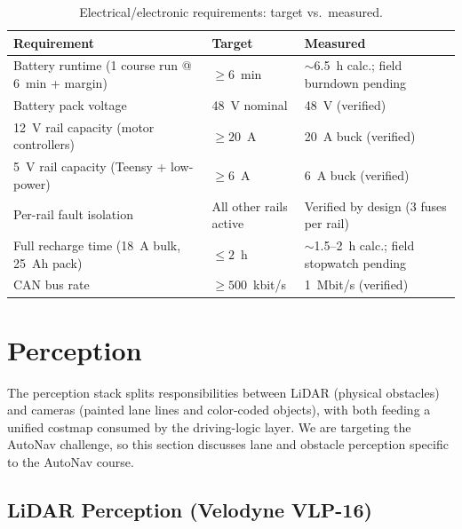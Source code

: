 \documentclass[12pt, letterpaper]{article}
\begin{document}
\begin{table}[H]
    \centering
    \small
    \caption{Electrical/electronic requirements: target vs.\ measured.}
    \begin{tabularx}{\textwidth}{X l l}
        \toprule
        \textbf{Requirement} & \textbf{Target} & \textbf{Measured} \\
        \midrule
        Battery runtime (1 course run @ 6~min + margin) & $\geq 6$~min               & $\sim$6.5~h calc.; field burndown pending \\
        Battery pack voltage                            & 48~V nominal                & 48~V (verified) \\
        12~V rail capacity (motor controllers)          & $\geq 20$~A                 & 20~A buck (verified) \\
        5~V rail capacity (Teensy + low-power)          & $\geq 6$~A                  & 6~A buck (verified) \\
        Per-rail fault isolation                        & All other rails active      & Verified by design (3 fuses per rail) \\
        Full recharge time (18~A bulk, 25~Ah pack)      & $\leq 2$~h                  & $\sim$1.5--2~h calc.; field stopwatch pending \\
        CAN bus rate                                    & $\geq 500$~kbit/s           & 1~Mbit/s (verified) \\
        \bottomrule
    \end{tabularx}
\end{table}

\section{Perception}
\label{sec:perception}

The perception stack splits responsibilities between LiDAR (physical obstacles) and
cameras (painted lane lines and color-coded objects), with both feeding a unified
costmap consumed by the driving-logic layer. We are targeting the AutoNav challenge, so
this section discusses lane and obstacle perception specific to the AutoNav course.

\subsection{LiDAR Perception (Velodyne VLP-16)}
\end{document}
